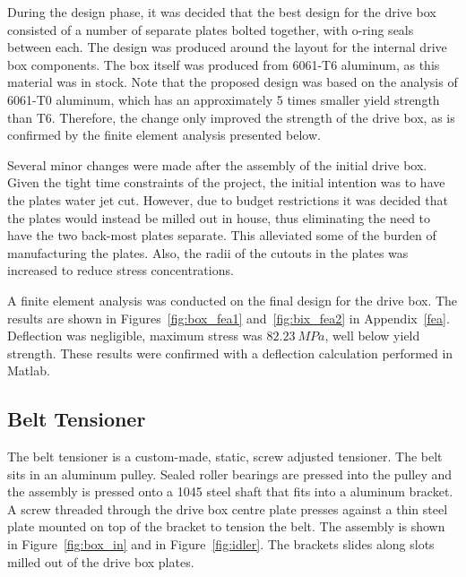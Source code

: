 During the design phase, it was decided that the best design for the drive box consisted of a number of separate plates bolted together, with o-ring seals between each. The design was produced around the layout for the internal drive box components. The box itself was produced from 6061-T6 aluminum, as this material was in stock. Note that the proposed design was based on the analysis of 6061-T0 aluminum, which has an approximately 5 times smaller yield  strength than T6. Therefore, the change only improved the strength of the drive box, as is confirmed by the finite element analysis presented below.

Several minor changes were made after the assembly of the initial drive box. Given the tight time constraints of the project, the initial intention was to have the plates water jet cut. However, due to budget restrictions it was decided that the plates would instead be milled out in house, thus eliminating the need to have the two back-most plates separate. This alleviated some of the burden of manufacturing the plates. Also, the radii of the cutouts in the plates was increased to reduce stress concentrations.

A finite element analysis was conducted on the final design for the drive box. The results are shown in Figures~\ref{fig:box_fea1} and~\ref{fig:bix_fea2} in Appendix~\ref{fea}. Deflection was negligible, maximum stress was ${82.23\ MPa}$, well below yield strength. These results were confirmed with a deflection calculation performed in Matlab.


\subsection{Belt Tensioner}

The belt tensioner is a custom-made, static, screw adjusted tensioner. The belt sits in an aluminum pulley. Sealed roller bearings are pressed into the pulley and the assembly is pressed onto a 1045 steel shaft that fits into a aluminum bracket. A screw threaded through the drive box centre plate presses against a thin steel plate mounted on top of the bracket to tension the belt. The assembly is shown in Figure~\ref{fig:box_in} and in Figure~\ref{fig:idler}. The brackets slides along slots milled out of the drive box plates.

